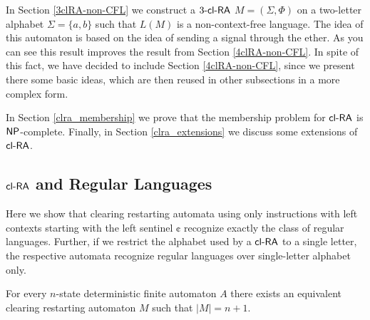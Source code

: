 In Section \ref{3clRA-non-CFL} we construct a $\kclRA[3]$ $M = (\Sigma, \Phi)$ on a two-letter alphabet $\Sigma = \{a, b\}$ such that $L(M)$ is a non-context-free language. The idea of this automaton is based on the idea of sending a signal through the ether. As you can see this result improves the result from Section \ref{4clRA-non-CFL}. In spite of this fact, we have decided to include Section \ref{4clRA-non-CFL}, since we present there some basic ideas, which are then reused in other subsections in a more complex form.

In Section \ref{clra_membership} we prove that the membership problem for $\clRA$ is $\classNP$-complete. Finally, in Section \ref{clra_extensions} we discuss some extensions of $\clRA$.

\subsection{$\clRA$ and Regular Languages}
\label{se:clRAandReg}

Here we show that clearing restarting automata using only instructions with left contexts starting with the left sentinel $\cent$ recognize exactly the class of regular languages. Further, if we restrict the alphabet used by a $\clRA$ to a single letter, the respective automata recognize regular languages over single-letter alphabet only.

\begin{theorem}\label{theorem:regular_to_clra}
For every $n$-state deterministic finite automaton $A$ there exists an equivalent  clearing restarting automaton $M$ such that $|M| = n+1$. 
\end{theorem}

